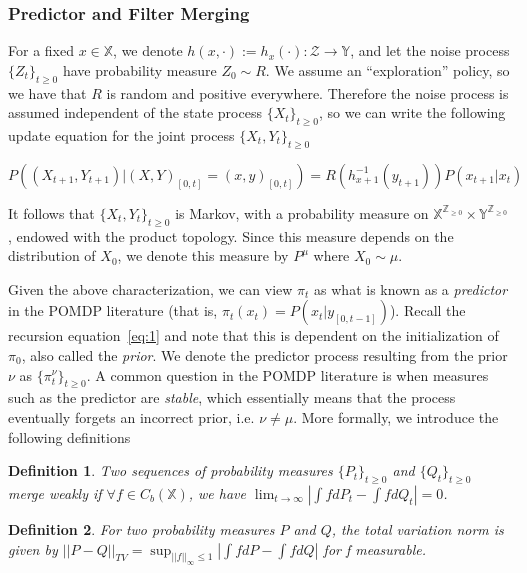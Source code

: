 \documentclass{article}
\newtheorem{definition}{Definition}[section]
\begin{document}
\subsubsection*{Predictor and Filter Merging}

For a fixed \( x \in \mathbb{X} \), we denote \( h(x,\cdot) := h_x(\cdot) : \mathcal{Z} \to \mathbb{Y} \), and let the noise process \( \{Z_t\}_{t\ge0} \) have probability measure \( Z_0 \sim R \). We assume an ``exploration'' policy, so we have that \(R\) is random and positive everywhere. Therefore the noise process is assumed independent of the state process \( \{X_t\}_{t\ge0} \), so we can write the following update equation for the joint process \( \{X_t,Y_t\}_{t\ge0} \)

\[ P((X_{t+1},Y_{t+1}) | (X,Y)_{[0,t]} = (x,y)_{[0,t]}) = R(h_{x+1}^{-1}(y_{t+1}))P(x_{t+1} | x_t) \]

It follows that \( \{X_t,Y_t\}_{t\ge0} \) is Markov, with a probability measure on \( \mathbb{X}^{\mathbb{Z}_{\ge0}} \times \mathbb{Y}^{\mathbb{Z}_{\ge0}} \), endowed with the product topology. Since this measure depends on the distribution of \( X_0 \), we denote this measure by \( P^\mu \) where \( X_0 \sim \mu \).

Given the above characterization, we can view \( \pi_t \) as what is known as a \emph{predictor} in the POMDP literature (that is, \( \pi_t(x_t) = P(x_t | y_{[0,t-1]}) \)). Recall the recursion equation~\eqref{eq:1} and note that this is dependent on the initialization of \( \pi_0 \), also called the \emph{prior}. We denote the predictor process resulting from the prior \( \nu \) as \( \{\pi_t^\nu \}_{t\ge0} \). A common question in the POMDP literature is when measures such as the predictor are \emph{stable}, which essentially means that the process eventually forgets an incorrect prior, i.e. \( \nu \neq \mu \). More formally, we introduce the following definitions

\begin{definition}\label{definition:weak_merge}
    Two sequences of probability measures \( \{P_t\}_{t\ge0} \) and \( \{Q_t\}_{t\ge0} \) merge weakly if \( \forall f \in C_b(\mathbb{X}) \), we have \( \lim_{t \to \infty} |\int fdP_t - \int fdQ_t| = 0\).
\end{definition}

\begin{definition}\label{definition:TV_merge}
    For two probability measures \( P \) and \( Q \), the total variation norm is given by \( ||P-Q||_{TV} = \sup_{||f||_\infty \le 1} |\int fdP - \int fdQ| \) for f measurable.
\end{definition}
\end{document}
